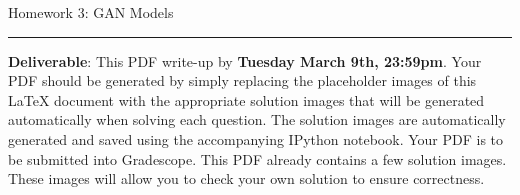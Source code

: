 \documentclass{article}
\newcommand{\ruleskip}{\bigskip\hrule\bigskip}
\begin{document}
\pagestyle{myheadings} 

{\huge
\noindent Homework 3: GAN Models}
\ruleskip

{\bf Deliverable}: This PDF write-up by {\bf Tuesday March 9th, 23:59pm}.  Your PDF should be generated by simply replacing the placeholder images of this LaTeX document with the appropriate solution images that will be generated automatically when solving each question. The solution images are automatically generated and saved using the accompanying IPython notebook. Your PDF is to be submitted into Gradescope. This PDF already contains a few solution images.  These images will allow you to check your own solution to ensure correctness.


\vspace{.2in}

\end{document}
